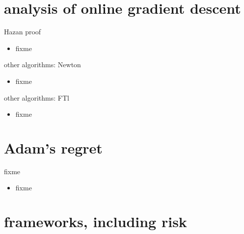 \documentclass[xcolor={svgnames},
               hyperref={colorlinks,citecolor=DeepPink4,linkcolor=FireBrick,urlcolor=Maroon}]
               {beamer}
\begin{document}
\section{analysis of online gradient descent}

\begin{frame}{Hazan proof}

\begin{itemize}
\item fixme
\end{itemize}
\end{frame}

\begin{frame}{other algorithms: Newton}

\begin{itemize}
\item fixme
\end{itemize}
\end{frame}

\begin{frame}{other algorithms: FTl}

\begin{itemize}
\item fixme
\end{itemize}
\end{frame}


\section{Adam's regret}

\begin{frame}{fixme}

\begin{itemize}
\item fixme
\end{itemize}
\end{frame}


\section{frameworks, including risk}
\end{document}

